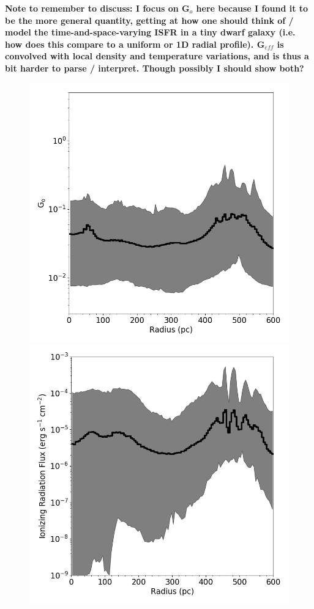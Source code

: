\documentclass[twocolumn]{aastex61}
\begin{document}
\textbf{Note to remember to discuss: I focus on G$_o$ here because I found it to be the more general quantity, getting at how one should think of / model the time-and-space-varying ISFR in a tiny dwarf galaxy (i.e. how does this compare to a uniform or 1D radial profile). G$_{eff}$ is convolved with local density and temperature variations, and is thus a bit harder to parse / interpret. Though possibly I should show both?}

\begin{figure}
\includegraphics[width=0.95\linewidth]{G_o_profile} \\
\includegraphics[width=0.95\linewidth]{ionizing_photon_profile}

\end{figure}
\end{document}
